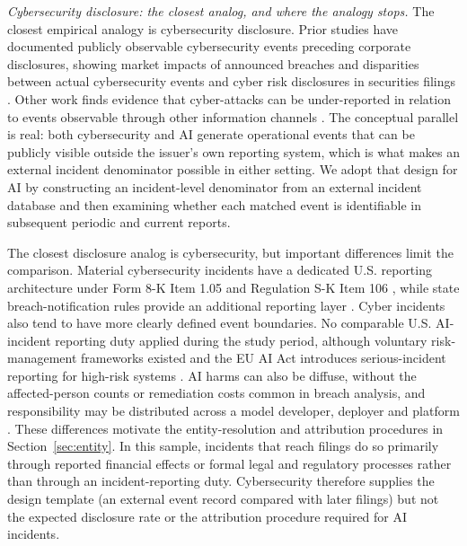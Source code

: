 \documentclass[utf8]{FrontiersinHarvard}
\begin{document}
\textit{Cybersecurity disclosure: the closest analog, and where the analogy stops.} The closest empirical analogy is cybersecurity disclosure. Prior studies have documented publicly observable cybersecurity events preceding corporate disclosures, showing market impacts of announced breaches and disparities between actual cybersecurity events and cyber risk disclosures in securities filings \citep{Campbell2003,KannanReesSridhar2007,Gordon2006,Gordon2010,WangKannanUlmer2013}. Other work finds evidence that cyber-attacks can be under-reported in relation to events observable through other information channels \citep{Amir2018}. The conceptual parallel is real: both cybersecurity and AI generate operational events that can be publicly visible outside the issuer's own reporting system, which is what makes an external incident denominator possible in either setting. We adopt that design for AI by constructing an incident-level denominator from an external incident database and then examining whether each matched event is identifiable in subsequent periodic and current reports.

The closest disclosure analog is cybersecurity, but important differences limit the comparison. Material cybersecurity incidents have a dedicated U.S. reporting architecture under Form 8-K Item 1.05 and Regulation S-K Item 106 \citep{SEC2023Cyber}, while state breach-notification rules provide an additional reporting layer \citep{RomanoskyTelangAcquisti2011}. Cyber incidents also tend to have more clearly defined event boundaries. No comparable U.S. AI-incident reporting duty applied during the study period, although voluntary risk-management frameworks existed \citep{NIST2023AIRMF} and the EU AI Act introduces serious-incident reporting for high-risk systems \citep{EUAIAct2024}. AI harms can also be diffuse, without the affected-person counts or remediation costs common in breach analysis, and responsibility may be distributed across a model developer, deployer and platform \citep{Cobbe2023,OECD2024}. These differences motivate the entity-resolution and attribution procedures in Section~\ref{sec:entity}. In this sample, incidents that reach filings do so primarily through reported financial effects or formal legal and regulatory processes rather than through an incident-reporting duty. Cybersecurity therefore supplies the design template (an external event record compared with later filings) but not the expected disclosure rate or the attribution procedure required for AI incidents.
\end{document}
